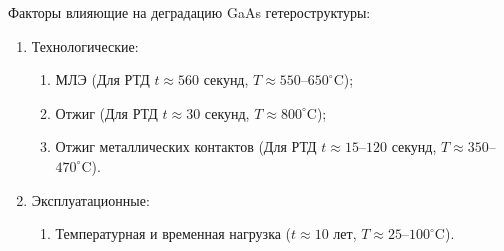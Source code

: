 Факторы влияющие на деградацию GaAs гетероструктуры:
\begin{enumerate}
	\item Технологические: \begin{enumerate}
		\item МЛЭ (Для РТД $t\approx560$ секунд, $T\approx550$--$650^{\circ}$C);
		\item Отжиг (Для РТД $t\approx30$ секунд, $T\approx800^{\circ}$C);
		\item Отжиг металлических контактов (Для РТД $t\approx15$--$120$ секунд, $T\approx350$--$470^{\circ}$C).
	\end{enumerate}
	\item Эксплуатационные:
	\begin{enumerate}
		\item Температурная и временная нагрузка ($t\approx 10$ лет, $T\approx25$--$100^{\circ}$C).
	\end{enumerate}
\end{enumerate}
